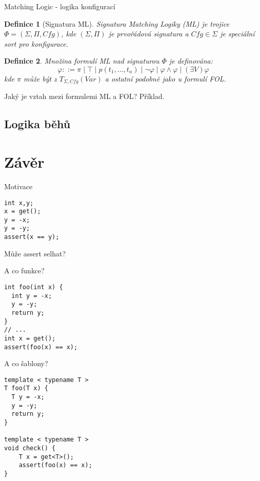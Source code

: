 \documentclass[11pt]{beamer}
\newtheorem{dfn}{Definice}
\begin{document}
\begin{frame}{Matching Logic - logika konfigurací}

\begin{dfn}[Signatura ML]
Signatura Matching Logiky (ML) je trojice $\Phi = \left( \Sigma, \Pi, \mathit{Cfg} \right)$,
kde $\left( \Sigma, \Pi \right)$ je prvořádová signatura a $\mathit{Cfg} \in \Sigma$ je speciální sort pro konfigurace.
\end{dfn}

\pause

\begin{dfn}
Množina formulí ML nad signaturou $\Phi$ je definována:
\begin{equation*}
\varphi ::= \pi \mid \top \mid p(t_1,\ldots,t_n) \mid \neg \varphi \mid \varphi \land \varphi \mid \left( \exists V \right) \varphi
\end{equation*}
kde $\pi$ může být z $T_{\Sigma, \mathit{Cfg}}\left( Var \right)$ a ostatní podobně jako u formulí FOL.
\end{dfn}

\pause
Jaký je vztah mezi formulemi ML a FOL?
\pause
Příklad.

\end{frame}


\subsection{Logika běhů}


\section{Závěr}

\begin{frame}[fragile]{Motivace}

\begin{lstlisting}
int x,y;
x = get();
y = -x;
y = -y;
assert(x == y);
\end{lstlisting}

Může assert selhat?

\end{frame}


\begin{frame}[fragile]{A co funkce?}
\begin{lstlisting}
int foo(int x) {
  int y = -x;
  y = -y;
  return y;
}
// ...
int x = get();
assert(foo(x) == x);
\end{lstlisting}
\end{frame}


\begin{frame}[fragile]{A co šablony?}
\begin{lstlisting}
template < typename T >
T foo(T x) {
  T y = -x;
  y = -y;
  return y;
}

template < typename T >
void check() {
    T x = get<T>();
    assert(foo(x) == x);
}
\end{lstlisting}
\end{frame}
\end{document}
